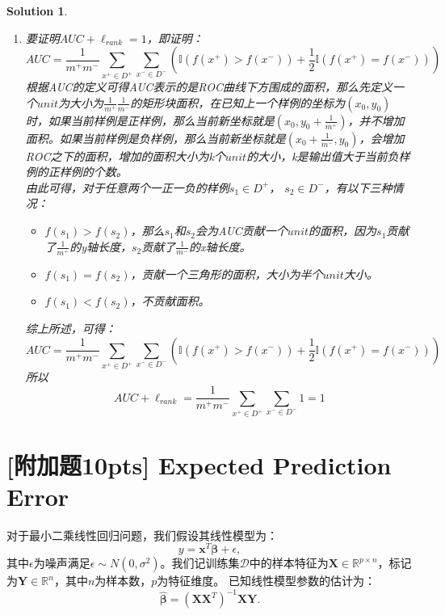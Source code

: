\documentclass[a4paper,UTF8]{article}
\numberwithin{equation}{section}
\newtheorem*{mySol}{Solution}
\begin{document}
\begin{mySol}
\begin{enumerate}
\item 
要证明${AUC}+\ell_{rank}=1$，即证明：
\begin{equation}
AUC = \frac{1}{m^+m^-}\sum_{x^+\in D^+}\sum_{x^-\in D^-}\left(\mathbb I\left(f\left(x^+\right)>f\left(x^-\right)\right) + \frac{1}{2}\mathbb{I}\left(f\left(x^+\right)=f\left(x^-\right)\right)\right)	
\end{equation}
根据AUC的定义可得AUC表示的是ROC曲线下方围成的面积，那么先定义一个$unit$为大小为$\frac{1}{m^+}\frac{1}{m^-}$的矩形块面积，在已知上一个样例的坐标为$(x_0, y_0)$时，如果当前样例是正样例，那么当前新坐标就是$(x_0, y_0+\frac{1}{m^+})$，并不增加面积。如果当前样例是负样例，那么当前新坐标就是$(x_0+\frac{1}{m^-}, y_0)$，会增加ROC之下的面积，增加的面积大小为k个$unit$的大小，k是输出值大于当前负样例的正样例的个数。\\
由此可得，对于任意两个一正一负的样例$s_1\in D^+$， $s_2\in D^-$，有以下三种情况：
\begin{itemize}
\item $f(s_1) > f(s_2)$，那么$s_1$和$s_2$会为AUC贡献一个$unit$的面积，因为$s_1$贡献了$\frac{1}{m^+}$的y轴长度，$s_2$贡献了$\frac{1}{m^-}$的x轴长度。
\item $f(s_1) = f(s_2)$，贡献一个三角形的面积，大小为半个$unit$大小。
\item $f(s_1) < f(s_2)$，不贡献面积。
\end{itemize}
综上所述，可得：
\begin{equation}
AUC = \frac{1}{m^+m^-}\sum_{x^+\in D^+}\sum_{x^-\in D^-}\left(\mathbb I\left(f\left(x^+\right)>f\left(x^-\right)\right) + \frac{1}{2}\mathbb{I}\left(f\left(x^+\right)=f\left(x^-\right)\right)\right)
\end{equation}
所以
\begin{equation}
AUC + \ell_{rank} = \frac{1}{m^+m^-}\sum_{x^+\in D^+}\sum_{x^-\in D^-}1 = 1
\end{equation}
\end{enumerate}


\end{mySol}

\newpage
\section{[附加题10pts] Expected Prediction Error}
对于最小二乘线性回归问题，我们假设其线性模型为：
\begin{equation}
	y=\textbf{x}^T  \bm{ \beta } + \epsilon , 
\end{equation}
其中$\epsilon$为噪声满足$\epsilon\sim N(0,\sigma^2)$。我们记训练集$\mathcal{D}$中的样本特征为$\textbf{X}\in \mathbb{R}^{p \times n}$，标记为$\textbf{Y}\in \mathbb{R}^{n}$，其中$n$为样本数，$p$为特征维度。
已知线性模型参数的估计为：
\begin{equation}
	\hat{\bm{\beta}}=(\textbf{X}\textbf{X}^T)^{-1}\textbf{X}\textbf{Y}.	
\end{equation}
\end{document}
